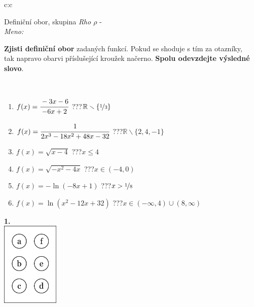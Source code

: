 \documentclass[10pt]{report}
\begin{document}
\begin{tabular}{c:c}
\begin{minipage}[c][104.5mm][t]{0.5\linewidth}
\begin{center}
\vspace{7mm}
{\huge Definiční obor, skupina \textit{Rho $\rho$} -}\\[5mm]
\textit{Meno:}\phantom{xxxxxxxxxxxxxxxxxxxxxxxxxxxxxxxxxxxxxxxxxxxxxxxxxxxxxxxxxxxxxxxxx}\\[5mm]
\begin{minipage}{0.95\linewidth}
\textbf{Zjisti definiční obor} zadaných funkcí. Pokud se shoduje s tím za otazníky,\\tak napravo obarvi příslušející kroužek načerno. \textbf{Spolu odevzdejte výsledné slovo}.
\end{minipage}
\\[1mm]
\begin{minipage}{0.79\linewidth}
\begin{center}
\begin{varwidth}{\linewidth}
\begin{enumerate}
\normalsizerrr
\item $f(x)=\cfrac{-3x-6}{-6x+2}$\quad \dotfill\; ???\;\dotfill \quad $\mathbb{R}\smallsetminus\{\nicefrac{1}{3}\}$
\item $f(x)=\cfrac{1}{2x^3-18x^2+48x-32}$\quad \dotfill\; ???\;\dotfill \quad $\mathbb{R}\smallsetminus\{2,4,-1\}$
\item $f(x)=\sqrt{x-4}$\quad \dotfill\; ???\;\dotfill \quad $x\leq4$
\item $f(x)=\sqrt{-x^2-4x}$\quad \dotfill\; ???\;\dotfill \quad $x\in(-4 , 0)$
\item $f(x)=-\ln{(-8x+1)}$\quad \dotfill\; ???\;\dotfill \quad $x>\nicefrac{1}{8}$
\item $f(x)=\ln{(x^2-12x+32)}$\quad \dotfill\; ???\;\dotfill \quad $x\in(-\infty , 4)\cup(8 , \infty)$
\end{enumerate}
\end{varwidth}
\end{center}
\end{minipage}
\begin{minipage}{0.20\linewidth}
\begin{center}
{\Huge\bfseries 1.} \\[2mm]
\includegraphics[height=40mm]{../images/braille.png}

\end{center}
\end{minipage}
\end{center}
\end{minipage}
\end{tabular}
\end{document}
